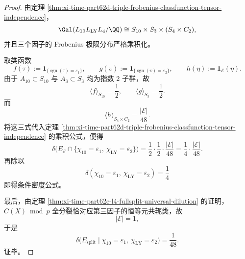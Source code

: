 \begin{proof}
由定理 \ref{thm:xi-time-part62d-triple-frobenius-classfunction-tensor-independence}，
\[
\Gal(L_{10}L_{\mathrm{LY}}L_4/\QQ)
\cong
S_{10}\times S_3\times (S_4\times C_2),
\]
并且三个因子的 Frobenius 极限分布严格乘积化。

取类函数
\[
f(\tau):=\mathbf 1_{\{\operatorname{sgn}(\tau)=\varepsilon_1\}},
\qquad
g(\upsilon):=\mathbf 1_{\{\operatorname{sgn}(\upsilon)=\varepsilon_2\}},
\qquad
h(\eta):=\mathbf 1_{\mathcal E}(\eta).
\]
由于 \(A_{10}\subset S_{10}\) 与 \(A_3\subset S_3\) 均为指数 \(2\) 子群，故
\[
\langle f\rangle_{S_{10}}=\frac12,
\qquad
\langle g\rangle_{S_3}=\frac12.
\]
而
\[
\langle h\rangle_{S_4\times C_2}=\frac{|\mathcal E|}{48}.
\]
将这三式代入定理 \ref{thm:xi-time-part62d-triple-frobenius-classfunction-tensor-independence} 的乘积公式，便得
\[
\delta\!\bigl(
E_{\mathcal E}\cap\{\chi_{10}=\varepsilon_1,\ \chi_{\mathrm{LY}}=\varepsilon_2\}
\bigr)
=
\frac12\cdot\frac12\cdot\frac{|\mathcal E|}{48}
=
\frac14\cdot\frac{|\mathcal E|}{48}.
\]
再除以
\[
\delta(\chi_{10}=\varepsilon_1,\ \chi_{\mathrm{LY}}=\varepsilon_2)=\frac14
\]
即得条件密度公式。

最后，由定理 \ref{thm:xi-time-part62e-l4-fullsplit-universal-dilution} 的证明，\(C(X)\bmod p\) 全分裂恰对应第三因子的恒等元共轭类，故
\[
|\mathcal E|=1,
\]
于是
\[
\delta\!\bigl(E_{\mathrm{split}}\mid \chi_{10}=\varepsilon_1,\ \chi_{\mathrm{LY}}=\varepsilon_2\bigr)=\frac{1}{48}.
\]
证毕。
\end{proof}

